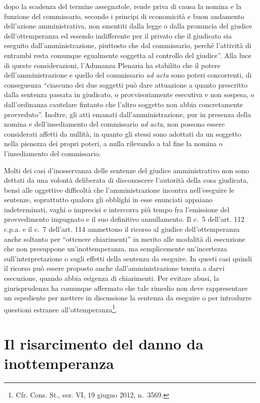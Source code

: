 \documentclass[12pt,it,a4paper,]{report}
\begin{document}
dopo la scadenza del termine assegnatole, rende priva di causa la nomina
e la funzione del commissario, secondo i principi di economicità e buon
andamento dell'azione amministrativa, non smentiti dalla legge o dalla
pronuncia del giudice dell'ottemperanza ed essendo indifferente per il
privato che il giudicato sia eseguito dall'amministrazione, piuttosto
che dal commissario, perché l'attività di entrambi resta comunque
egualmente soggetta al controllo del giudice''. Alla luce di queste
considerazioni, l'Adunanza Plenaria ha stabilito che il potere
dell'amministrazione e quello del commissario \emph{ad acta} sono poteri
concorrenti, di conseguenza ``ciascuno dei due soggetti può dare
attuazione a quanto prescritto dalla sentenza passata in giudicato, o
provvisoriamente esecutiva e non sospesa, o dall'ordinanza cautelare
fintanto che l'altro soggetto non abbia concretamente provveduto''.
Inoltre, gli atti emanati dall'amministrazione, pur in presenza della
nomina e dell'insediamento del commissario \emph{ad acta}, non possono
essere considerati affetti da nullità, in quanto gli stessi sono
adottati da un soggetto nella pienezza dei propri poteri, a nulla
rilevando a tal fine la nomina o l'insediamento del commissario.

Molti dei casi d'inosservanza delle sentenze del giudice amministrativo
non sono dettati da una volontà deliberata di disconoscere l'autorità
della cosa giudicata, bensì alle oggettive difficoltà che
l'amministrazione incontra nell'eseguire le sentenze, soprattutto
qualora gli obblighi in esse enunciati appaiano indeterminati, vaghi o
imprecisi e intercorra più tempo fra l'emissione del provvedimento
impugnato e il suo definitivo annullamento. Il c.~5 dell'art. 112 c.p.a.
e il c.~7 dell'art. 114 ammettono il ricorso al giudice
dell'ottemperanza anche soltanto per ``ottenere chiarimenti'' in merito
alle modalità di esecuzione che non presuppone un'inottemperanza, ma
semplicemente un'incertezza sull'interpretazione o sugli effetti della
sentenza da eseguire. In questi casi quindi il ricorso può essere
proposto anche dall'amministrazione tenuta a darvi esecuzione, quando
abbia esigenza di chiarimenti. Per evitare abusi, la giurisprudenza ha
comunque affermato che tale rimedio non deve rappresentare un espediente
per mettere in discussione la sentenza da eseguire o per introdurre
questioni estranee all'ottemperanza\footnote{Cfr. Cons. St., sez. VI, 19
  giugno 2012, n.~3569.}.

\hypertarget{il-risarcimento-del-danno-da-inottemperanza}{%
\section{Il risarcimento del danno da
inottemperanza}\label{il-risarcimento-del-danno-da-inottemperanza}}
\end{document}

